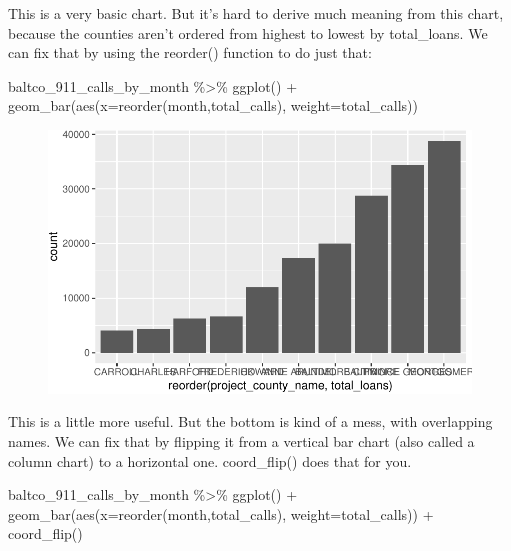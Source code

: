 \documentclass[
  letterpaper,
  DIV=11,
  numbers=noendperiod]{scrreprt}
\newenvironment{Shaded}{\begin{snugshade}}{\end{snugshade}}
\newcommand{\AttributeTok}[1]{\textcolor[rgb]{0.40,0.45,0.13}{#1}}
\newcommand{\FunctionTok}[1]{\textcolor[rgb]{0.28,0.35,0.67}{#1}}
\newcommand{\NormalTok}[1]{\textcolor[rgb]{0.00,0.23,0.31}{#1}}
\newcommand{\SpecialCharTok}[1]{\textcolor[rgb]{0.37,0.37,0.37}{#1}}
\begin{document}
This is a very basic chart. But it's hard to derive much meaning from
this chart, because the counties aren't ordered from highest to lowest
by total\_loans. We can fix that by using the reorder() function to do
just that:

\begin{Shaded}
\begin{Highlighting}[]
\NormalTok{baltco\_911\_calls\_by\_month }\SpecialCharTok{\%\textgreater{}\%}
  \FunctionTok{ggplot}\NormalTok{() }\SpecialCharTok{+}
  \FunctionTok{geom\_bar}\NormalTok{(}\FunctionTok{aes}\NormalTok{(}\AttributeTok{x=}\FunctionTok{reorder}\NormalTok{(month,total\_calls), }\AttributeTok{weight=}\NormalTok{total\_calls))}
\end{Highlighting}
\end{Shaded}

\begin{figure}[H]

{\centering \includegraphics{./visualizing-for-reporting_files/figure-pdf/unnamed-chunk-6-1.pdf}

}

\end{figure}

This is a little more useful. But the bottom is kind of a mess, with
overlapping names. We can fix that by flipping it from a vertical bar
chart (also called a column chart) to a horizontal one. coord\_flip()
does that for you.

\begin{Shaded}
\begin{Highlighting}[]
\NormalTok{baltco\_911\_calls\_by\_month }\SpecialCharTok{\%\textgreater{}\%}
  \FunctionTok{ggplot}\NormalTok{() }\SpecialCharTok{+}
  \FunctionTok{geom\_bar}\NormalTok{(}\FunctionTok{aes}\NormalTok{(}\AttributeTok{x=}\FunctionTok{reorder}\NormalTok{(month,total\_calls), }\AttributeTok{weight=}\NormalTok{total\_calls)) }\SpecialCharTok{+}
  \FunctionTok{coord\_flip}\NormalTok{()}
\end{Highlighting}
\end{Shaded}
\end{document}
